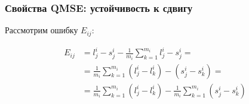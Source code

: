 \documentclass[unicode, notheorems]{beamer}
\begin{document}
\begin{frame}
\frametitle{Свойства QMSE: устойчивость к сдвигу}
Рассмотрим ошибку $E_{ij}$:

\begin{equation*}
\begin{split}
E_{ij} & =  l^i_j - s^i_j -  \frac{1}{m_i}\sum_{k=1}^{m_i}{l^i_j - s^i_j} = \\ & = \frac{1}{m_i}\sum_{k=1}^{m_i}{(l^i_j - l^i_k) - (s^i_j - s^i_k)} = \\ & = \frac{1}{m_i}\sum_{k=1}^{m_i}{(l^i_j - l^i_k)} - \frac{1}{m_i}\sum_{k=1}^{m_i}{(s^i_j - s^i_k)}
\end{split}
\end{equation*}

\end{frame}
\end{document}
